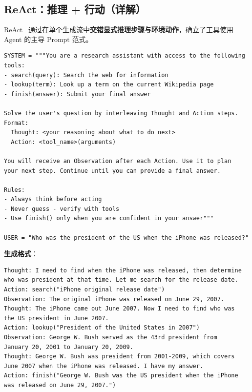 \subsection{ReAct：推理 + 行动（详解）}
\label{react-reasoning-acting-detailed}

ReAct~\cite{yao2023react} 通过在单个生成流中\textbf{交错显式推理步骤与环境动作}，确立了工具使用 Agent 的主导 Prompt 范式。

\begin{examplebox}
\begin{lstlisting}[style=pythonstyle]
SYSTEM = """You are a research assistant with access to the following tools:
- search(query): Search the web for information
- lookup(term): Look up a term on the current Wikipedia page
- finish(answer): Submit your final answer

Solve the user's question by interleaving Thought and Action steps.
Format:
  Thought: <your reasoning about what to do next>
  Action: <tool_name>(arguments)

You will receive an Observation after each Action. Use it to plan
your next step. Continue until you can provide a final answer.

Rules:
- Always think before acting
- Never guess - verify with tools
- Use finish() only when you are confident in your answer"""

USER = "Who was the president of the US when the iPhone was released?"
\end{lstlisting}
\end{examplebox}

\textbf{生成格式}：

\begin{examplebox}
\begin{lstlisting}[style=pythonstyle]
Thought: I need to find when the iPhone was released, then determine
who was president at that time. Let me search for the release date.
Action: search("iPhone original release date")
Observation: The original iPhone was released on June 29, 2007.
Thought: The iPhone came out June 2007. Now I need to find who was
the US president in June 2007.
Action: lookup("President of the United States in 2007")
Observation: George W. Bush served as the 43rd president from
January 20, 2001 to January 20, 2009.
Thought: George W. Bush was president from 2001-2009, which covers
June 2007 when the iPhone was released. I have my answer.
Action: finish("George W. Bush was the US president when the iPhone
was released on June 29, 2007.")
\end{lstlisting}
\end{examplebox}


